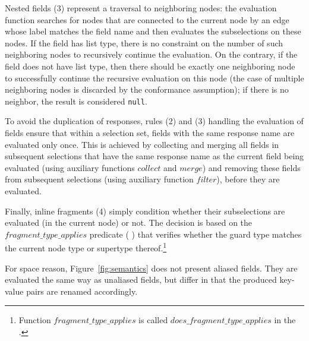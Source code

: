 Nested fields (3) represent a traversal to neighboring nodes: the
evaluation function searches for nodes that are connected to the
current node by an edge whose label matches the field name and then
evaluates the subselections on these nodes. If the field has list
type, there is no constraint on the number of such neighboring nodes
to recursively continue the evaluation. On the contrary, if the field
does not have list type, then there should be exactly one neighboring
node to successfully continue the recursive evaluation on this node
(the case of multiple neighboring nodes is discarded by the
conformance assumption); if there is no neighbor, the result is
considered
\texttt{null}. %

To avoid the duplication of responses, rules (2) and (3) handling the
evaluation of fields ensure that within a selection set, fields with the same
response name are evaluated only once. This is achieved by collecting
and merging all fields in subsequent selections that have the same
response name as the current field being evaluated (using auxiliary functions
$\mathit{collect}$ and $\mathit{merge}$) and removing these fields
from subsequent selections (using auxiliary function
$\mathit{filter}$), before they are evaluated.

Finally, inline fragments (4) simply condition whether their
subselections are evaluated (in the current node) or not. The decision
is based on the $\mathit{fragment\_type\_applies}$ predicate (\cf
\cite[\S6.3.2]{gqlspec}) that verifies whether the guard type matches
the current node type or supertype thereof.\footnote{Function
  $\mathit{fragment\_type\_applies}$ is called
  $\mathit{does\_fragment\_type\_applies}$ in the \spec.}

For space reason, Figure~\ref{fig:semantics} does not present aliased fields. They are evaluated the same way as unaliased fields, but differ in that the
produced key-value pairs are renamed accordingly.



